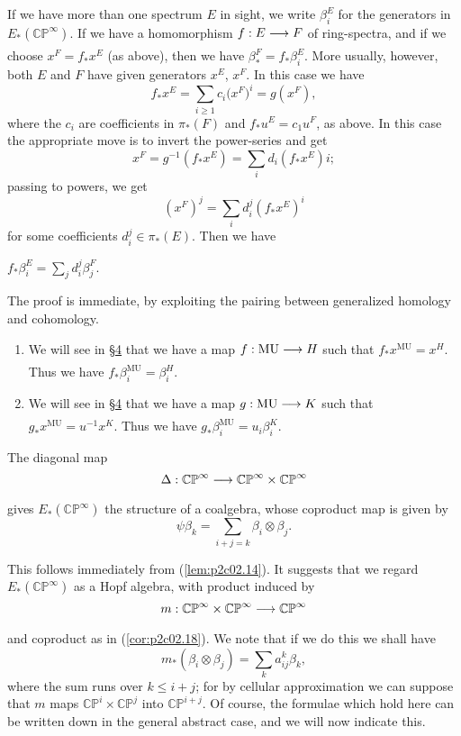 \documentclass[../main]{subfiles}
\begin{document}
If we have more than one spectrum $E$ in sight, we write $\beta_i^E$ for the generators in $E_\ast(\mathbb {CP}^\infty)$. If we have a homomorphism $f : E \lar{} F$ of ring-spectra, and if we choose $x^F = f_\ast x^E$ (as above), then we have $\beta_\ast^F = f_\ast \beta_i^E$. More usually, however, both $E$ and $F$ have given generators $x^E$, $x^F$. In this case we have \[f_\ast x^E = \sum_{i \ge 1} c_i \big(x^F\big)^i = g(x^F),\] where the $c_i$ are coefficients in $\pi_\ast(F)$ and $f_\ast u^E = c_1 u^F$, as above. In this case the appropriate move is to invert the power-series and get \[x^F = g^{-1}(f_\ast x^E) = \sum_i d_i (f_\ast x^E)i;\] passing to powers, we get \[(x^F)^j = \sum_i d_i^j (f_\ast x^E)^i\] for some coefficients $d_i^j \in \pi_\ast(E)$. Then we have

\begin{customlemma}{2.15}
\label{lem:p2c02.15} $\displaystyle f_\ast \beta_i^E = \sum_j d_i^j \beta_j^F.$
\end{customlemma}

The proof is immediate, by exploiting the pairing between generalized homology and cohomology.

\begin{examples}
\begin{enumerate}
    \item[(2.16)] We will see in \hyperref[sec:p2c4]{\S 4} that we have a map $f : \mathrm{MU} \lar{} H$ such that $f_\ast x^{\mathrm{MU}} = x^H$. Thus we have $f_\ast \beta_i^{\mathrm{MU}} = \beta_i^H$.
    \item[(2.17)] We will see in \hyperref[sec:p2c4]{\S 4} that we have a map $g : \mathrm{MU} \lar{} K$ such that $g_\ast x^{\mathrm{MU}} = u^{-1} x^K$. Thus we have $g_\ast \beta_i^{\mathrm{MU}} = u_i \beta_i^K$. 
\end{enumerate}
\end{examples}

\begin{customcor}{2.18}
\label{cor:p2c02.18}
The diagonal map \[\Delta : \mathbb {CP}^\infty \lar{} \mathbb {CP}^\infty \times \mathbb {CP}^\infty\] gives $E_\ast(\mathbb {CP}^\infty)$ the structure of a coalgebra, whose coproduct map is given by \[\psi \beta_k = \sum_{i + j = k} \beta_i \otimes \beta_j.\]
\end{customcor}

This follows immediately from (\ref{lem:p2c02.14}). It suggests that we regard $E_\ast(\mathbb {CP}^\infty)$ as a Hopf algebra, with product induced by \[m : \mathbb {CP}^\infty \times \mathbb {CP}^\infty \lar{} \mathbb {CP}^\infty\] and coproduct as in (\ref{cor:p2c02.18}). We note that if we do this we shall have \[m_\ast(\beta_i \otimes \beta_j) = \sum_k a_{ij}^k \beta_k,\] where the sum runs over $k \le i + j$; for by cellular approximation we can suppose that $m$ maps $\mathbb {CP}^i \times \mathbb {CP}^j$ into $\mathbb {CP}^{i + j}$. Of course, the formulae which hold here can be written down in the general abstract case, and we will now indicate this.  
\end{document}
